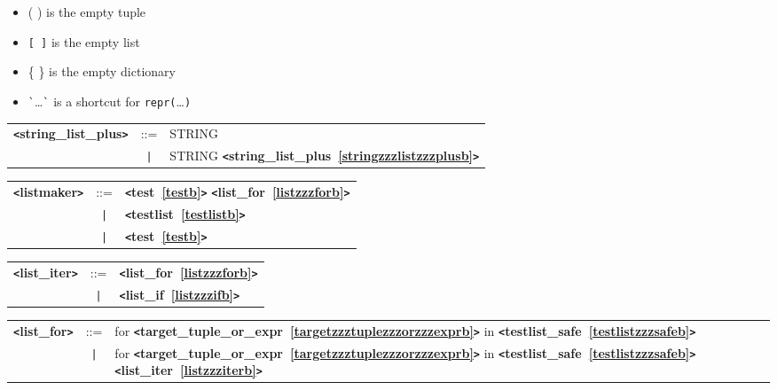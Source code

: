 \documentclass[12pt]{article}
\begin{document}
\begin{itemize}
\item ( ) is the empty tuple
\item \verb|[ ]| is the empty list
\item \{ \} is the empty dictionary
\item \verb|`|\ldots\verb|`| is a shortcut for \verb|repr(|\ldots\verb|)|
\end{itemize}

\label{stringzzzlistzzzplusb}
\begin{tabular}{lcl}
{\bf \verb+<+string\_list\_plus\verb+>+} & ::=  & STRING \\
 & \verb+|+  & STRING {\bf \verb+<+string\_list\_plus~\ref{stringzzzlistzzzplusb}\verb+>+}  \\
\end{tabular}

\label{listmakerb}
\begin{tabular}{lcl}
{\bf \verb+<+listmaker\verb+>+} & ::=  & {\bf \verb+<+test~\ref{testb}\verb+>+}  {\bf \verb+<+list\_for~\ref{listzzzforb}\verb+>+}  \\
 & \verb+|+  & {\bf \verb+<+testlist~\ref{testlistb}\verb+>+}  \\
 & \verb+|+  & {\bf \verb+<+test~\ref{testb}\verb+>+}  \\
\end{tabular}

\label{listzzziterb}
\begin{tabular}{lcl}
{\bf \verb+<+list\_iter\verb+>+} & ::=  & {\bf \verb+<+list\_for~\ref{listzzzforb}\verb+>+}  \\
 & \verb+|+  & {\bf \verb+<+list\_if~\ref{listzzzifb}\verb+>+}  \\
\end{tabular}

\label{listzzzforb}
\newlength{\tw}
\settowidth{\tw}{list\_for  ::=  }
\addtolength{\tw}{2\arraycolsep}
\newlength{\len}
\setlength{\len}{\textwidth}
\addtolength{\len}{-1\tw}
\begin{tabular}{lcp{\len}}
{\bf \verb+<+list\_for\verb+>+} & ::=  & for {\bf \verb+<+target\_tuple\_or\_expr~\ref{targetzzztuplezzzorzzzexprb}\verb+>+}  in {\bf \verb+<+testlist\_safe~\ref{testlistzzzsafeb}\verb+>+}  \\
 & \verb+|+  & for {\bf \verb+<+target\_tuple\_or\_expr~\ref{targetzzztuplezzzorzzzexprb}\verb+>+}  in {\bf \verb+<+testlist\_safe~\ref{testlistzzzsafeb}\verb+>+}  {\bf \verb+<+list\_iter~\ref{listzzziterb}\verb+>+}  \\
\end{tabular} \\
\end{document}

